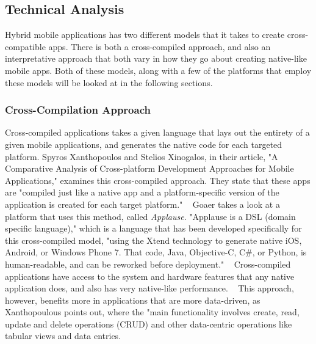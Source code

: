 \documentclass[11pt, twocolumn]{article}
\begin{document}
\subsection{Technical Analysis}
Hybrid mobile applications has two different models that it takes to create cross-compatible apps.  There is both a cross-compiled approach, and also an interpretative approach that both vary in how they go about creating native-like mobile apps.  Both of these models, along with a few of the platforms that employ these models will be looked at in the following sections.\\

\subsubsection{Cross-Compilation Approach}
Cross-compiled applications takes a given language that lays out the entirety of a given mobile applications, and generates the native code for each targeted platform.  Spyros Xanthopoulos and Stelios Xinogalos, in their article, "A Comparative Analysis of Cross-platform Development Approaches for Mobile Applications," examines this cross-compiled approach.  They state that these apps are "compiled just like a native app and a platform-specific version of the application is created for each target platform." ~\cite{Xanthopoulos2013}  Goaer takes a look at a platform that uses this method, called {\it Applause}.  "Applause is a DSL (domain specific language)," which is a language that has been developed specifically for this cross-compiled model, "using the Xtend technology to generate native iOS, Android, or Windows Phone 7.  That code, Java, Objective-C, C\#, or Python, is human-readable, and can be reworked before deployment." ~\cite{Goaer2013} Cross-compiled applications have access to the system and hardware features that any native application does, and also has very native-like performance. ~\cite{Xanthopoulos2013}  This approach, however, benefits more in applications that are more data-driven, as Xanthopoulous points out, where the "main functionality involves create, read, update and delete operations (CRUD) and other data-centric operations like tabular views and data entries. ~\cite{Xanthopoulos2013} \\
\end{document}
